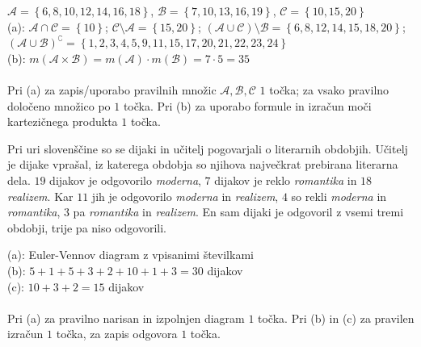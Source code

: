 \documentclass[addpoints]{exam}
\begin{document}
\begin{questions}
    \begin{solution}[9cm]
        $\mathcal{A}=\left\{6,8,10,12,14,16,18\right\}$, $\mathcal{B}=\left\{7,10,13,16,19\right\}$, $\mathcal{C}=\left\{10,15,20\right\}$ \\
        (a): $\mathcal{A}\cap\mathcal{C}=\left\{10\right\}$; $\mathcal{C}\setminus\mathcal{A}=\left\{15,20\right\}$; $(\mathcal{A}\cup\mathcal{C})\setminus\mathcal{B}=\left\{6,8,12,14,15,18,20\right\}$; $(\mathcal{A}\cup\mathcal{B})^\complement=\left\{1,2,3,4,5,9,11,15,17,20,21,22,23,24\right\}$ \\
        (b): $m(\mathcal{A}\times\mathcal{B})=m(\mathcal{A})\cdot m(\mathcal{B})=7\cdot 5 = 35$ \\ \\
        Pri (a) za zapis/uporabo pravilnih množic $\mathcal{A}, \mathcal{B}, \mathcal{C}$ $1$ točka; za vsako pravilno določeno množico po $1$ točka. Pri (b) za uporabo formule in izračun moči kartezičnega produkta $1$ točka.
    \end{solution}


  \newpage  
    \question
    Pri uri slovenščine so se dijaki in učitelj pogovarjali o literarnih obdobjih.  Učitelj je dijake vprašal, iz katerega obdobja so njihova največkrat prebirana literarna dela.
    $19$ dijakov je odgovorilo \textit{moderna}, $7$ dijakov je reklo \textit{romantika} in $18$ \textit{realizem}. Kar $11$ jih je odgovorilo \textit{moderna} in \textit{realizem}, $4$ so rekli \textit{moderna} in \textit{romantika},
    $3$ pa \textit{romantika} in \textit{realizem}. En sam dijaki je odgovoril z vsemi tremi obdobji, trije pa niso odgovorili. 

    \begin{solution}[8cm]
        (a): Euler-Vennov diagram z vpisanimi številkami \\
        (b): $5+1+5+3+2+10+1+3=30$ dijakov \\
        (c): $10+3+2=15$ dijakov \\ \\
        Pri (a) za pravilno narisan in izpolnjen diagram $1$ točka. Pri (b) in (c) za pravilen izračun $1$ točka, za zapis odgovora $1$ točka.
    \end{solution}





\end{questions}
\end{document}
